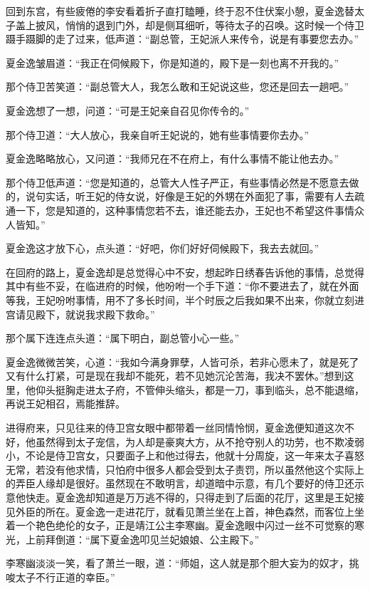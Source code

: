 回到东宫，有些疲倦的李安看着折子直打瞌睡，终于忍不住伏案小憩，夏金逸替太子盖上披风，悄悄的退到门外，却是侧耳细听，等待太子的召唤。这时候一个侍卫蹑手蹑脚的走了过来，低声道：“副总管，王妃派人来传令，说是有事要您去办。”

夏金逸皱眉道：“我正在伺候殿下，你是知道的，殿下是一刻也离不开我的。”

那个侍卫苦笑道：“副总管大人，我怎么敢和王妃说这些，您还是回去一趟吧。”

夏金逸想了一想，问道：“可是王妃亲自召见你传令的。”

那个侍卫道：“大人放心，我亲自听王妃说的，她有些事情要你去办。”

夏金逸略略放心，又问道：“我师兄在不在府上，有什么事情不能让他去办。”

那个侍卫低声道：“您是知道的，总管大人性子严正，有些事情必然是不愿意去做的，说句实话，听王妃的侍女说，好像是王妃的外甥在外面犯了事，需要有人去疏通一下，您是知道的，这种事情您若不去，谁还能去办，王妃也不希望这件事情众人皆知。”

夏金逸这才放下心，点头道：“好吧，你们好好伺候殿下，我去去就回。”

在回府的路上，夏金逸却是总觉得心中不安，想起昨日绣春告诉他的事情，总觉得其中有些不妥，在临进府的时候，他吩咐一个手下道：“你不要进去了，就在外面等我，王妃吩咐事情，用不了多长时间，半个时辰之后我如果不出来，你就立刻进宫请见殿下，就说我求殿下救命。”

那个属下连连点头道：“属下明白，副总管小心一些。”

夏金逸微微苦笑，心道：“我如今满身罪孽，人皆可杀，若非心愿未了，就是死了又有什么打紧，可是现在我却不能死，若不见她沉沦苦海，我决不罢休。”想到这里，他仰头挺胸走进太子府，不管伸头缩头，都是一刀，事到临头，总不能退缩，再说王妃相召，焉能推辞。

进得府来，只见往来的侍卫宫女眼中都带着一丝同情怜悯，夏金逸便知道这次不好，他虽然得到太子宠信，为人却是豪爽大方，从不抢夺别人的功劳，也不欺凌弱小，不论是侍卫宫女，只要面子上和他过得去，他就十分周旋，这一年来太子喜怒无常，若没有他求情，只怕府中很多人都会受到太子责罚，所以虽然他这个实际上的弄臣人缘却是很好。虽然现在不敢明言，却道暗中示意，有几个要好的侍卫还示意他快走。夏金逸却知道是万万逃不得的，只得走到了后面的花厅，这里是王妃接见外臣的所在。夏金逸一走进花厅，就看见萧兰坐在上首，神色森然，而客位上坐着一个艳色绝伦的女子，正是靖江公主李寒幽。夏金逸眼中闪过一丝不可觉察的寒光，上前拜倒道：“属下夏金逸叩见兰妃娘娘、公主殿下。”

李寒幽淡淡一笑，看了萧兰一眼，道：“师姐，这人就是那个胆大妄为的奴才，挑唆太子不行正道的幸臣。”

